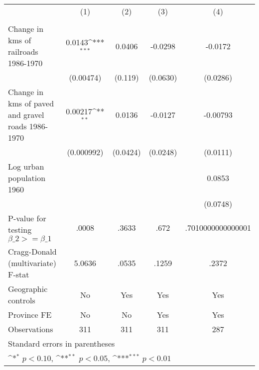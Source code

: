 {
\def\sym#1{\ifmmode^{#1}\else\(^{#1}\)\fi}
\begin{tabular}{l*{4}{c}}
\hline\hline
                &\multicolumn{1}{c}{(1)}&\multicolumn{1}{c}{(2)}&\multicolumn{1}{c}{(3)}&\multicolumn{1}{c}{(4)}\\
                &\multicolumn{1}{c}{}&\multicolumn{1}{c}{}&\multicolumn{1}{c}{}&\multicolumn{1}{c}{}\\
\hline
Change in kms of railroads 1986-1970&   0.0143\sym{***}&   0.0406         &  -0.0298         &  -0.0172         \\
                &(0.00474)         &  (0.119)         & (0.0630)         & (0.0286)         \\
[1em]
Change in kms of paved and gravel roads 1986-1970&  0.00217\sym{**} &   0.0136         &  -0.0127         & -0.00793         \\
                &(0.000992)         & (0.0424)         & (0.0248)         & (0.0111)         \\
[1em]
Log urban population 1960&                  &                  &                  &   0.0853         \\
                &                  &                  &                  & (0.0748)         \\
\hline
P-value for testing $\beta\_{2} >= \beta\_{1}$&    .0008         &    .3633         &     .672         &.7010000000000001         \\
Cragg-Donald (multivariate) F-stat&   5.0636         &    .0535         &    .1259         &    .2372         \\
Geographic controls&       No         &      Yes         &      Yes         &      Yes         \\
Province FE     &       No         &       No         &      Yes         &      Yes         \\
Observations    &      311         &      311         &      311         &      287         \\
\hline\hline
\multicolumn{5}{l}{\footnotesize Standard errors in parentheses}\\
\multicolumn{5}{l}{\footnotesize \sym{*} \(p<0.10\), \sym{**} \(p<0.05\), \sym{***} \(p<0.01\)}\\
\end{tabular}
}
